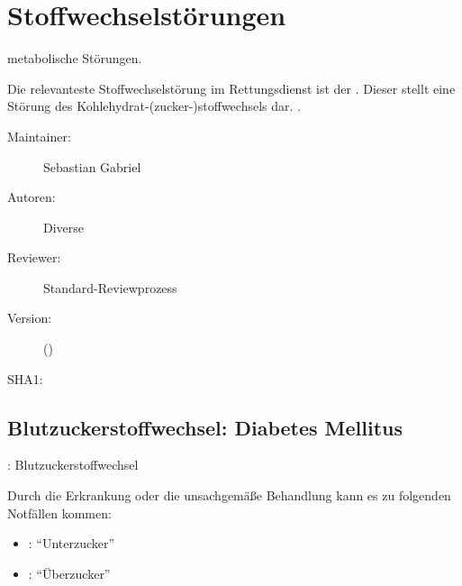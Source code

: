 \def\ChapterCode{STW}
\chapter
[\CO{[STW]} Stoffwechselstörungen]
{Stoffwechselstörungen}
\ChapterIntro
{%
 metabolische Störungen.

Die relevanteste Stoffwechselstörung im Rettungsdienst ist der
. Dieser
stellt eine Störung des Kohlehydrat-(zucker-)stoffwechsels dar.
. 
}
{%
\begin{description}
  \item[Maintainer:] Sebastian Gabriel
  \item[Autoren:] Diverse
  \item[Reviewer:] Standard-Reviewprozess
  \item[Version:] {\DocVersion} ({\DocVersionInfo})
  \item[SHA1:] {\DocGitCommit}
\end{description}

{\TxTeilkapitelAASS}
}


\clearpage
\section{Blutzuckerstoffwechsel: Diabetes Mellitus}
\label{topic:diabetes}
\label{topic:diabetes-mellitus}



{\TxBeschreibung: Blutzuckerstoffwechsel}
{ 
Durch die Erkrankung oder die unsachgemäße Behandlung kann es zu 
folgenden Notfällen kommen:

\begin{itemize}
  \item {}: \enquote{Unterzucker}
  \item {}: \enquote{Überzucker}
\end{itemize}}
{}
{}
{}
{}


